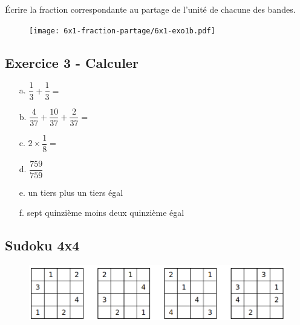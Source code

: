 Écrire la fraction correspondante au partage de l'unité de chacune des bandes. 

\begin{figure}[H]
    \centering
    \texttt{[image: 6x1-fraction-partage/6x1-exo1b.pdf]}
  \end{figure}


\subsection*{Exercice 3 - Calculer}

\begin{enumerate}
    \item[a.] $\dfrac{1}{3} + \dfrac{1}{3} = $ \dotfill
    \item[b.] $\dfrac{4}{37} + \dfrac{10}{37} + \dfrac{2}{37} = $ \dotfill
    \item[c.] $2 \times \dfrac{1}{8} = $ \dotfill
    \item[d.] $\dfrac{759}{759}$ \dotfill
    \item[e.] un tiers plus un tiers égal \dotfill
    \item[f.] sept quinzième moins deux quinzième égal \dotfill
 \end{enumerate}


\subsection*{Sudoku 4x4}

\begin{figure}[H]
  \centering
  \includegraphics[width=0.8\linewidth]{6x1-fraction-partage/sudoku-4b.png}
\end{figure}


